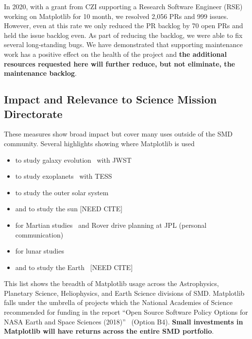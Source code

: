 \documentclass[12pt]{article}
\numberwithin{page}{section}
\begin{document}

In 2020, with a grant from CZI supporting a Research Software Engineer
(RSE) working on Matplotlib for 10 month, we resolved 2,056 PRs and
999 issues.  However, even at this rate we only reduced the PR backlog
by 70 open PRs and held the issue backlog even.  As part of reducing
the backlog, we were able to fix several long-standing bugs.  We have
demonstrated that supporting maintenance work has a positive effect on
the health of the project and \textbf{the additional resources
  requested here will further reduce, but not eliminate, the
  maintenance backlog}.


\subsection{Impact and Relevance to Science Mission Directorate}






These measures show broad impact but cover many uses outside of the
SMD community.  Several highlights showing where Matplotlib is used

\begin{itemize}[noitemsep]
\item to study galaxy evolution~\cite{2022ApJ...940L..14N} with JWST
\item to study exoplanets~\cite{2020AJ....160..116G, Barclay_2018,2019AJ....158...27L} with TESS
\item to study the outer solar system~\cite{Emran_2023}
\item and to study the sun [NEED CITE]
\item for Martian studies~\cite{2022JE007697} and Rover drive planning at JPL (personal communication)
\item for lunar studies~\cite{NESNAS2023163}
\item and to study the Earth~\cite{paolo_2024} [NEED CITE]
\end{itemize}

This list shows the breadth of Matplotlib usage across the Astrophysics,
Planetary Science, Heliophysics, and Earth Science divisions of SMD.
Matplotlib falls under the umbrella of projects which the National Academies of
Science recommended for funding in the report ``Open Source Software Policy
Options for NASA Earth and Space Sciences (2018)''~\cite{NAP25217} (Option B4).
\textbf{Small investments in Matplotlib will have returns across the entire SMD
  portfolio}.
\end{document}
